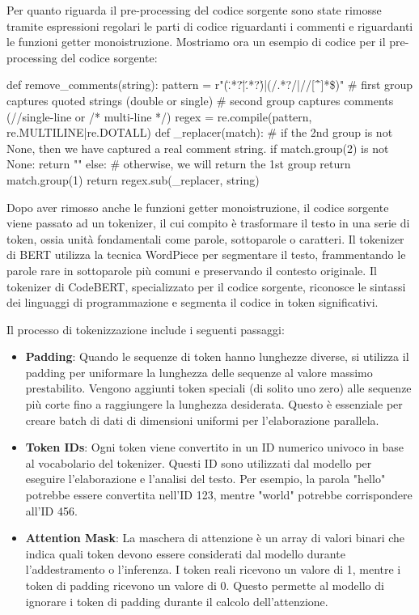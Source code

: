 \documentclass[../../Thesis.tex]{subfiles}
\begin{document}
Per quanto riguarda il pre-processing del codice sorgente sono state rimosse tramite espressioni regolari le parti di codice riguardanti i commenti e riguardanti le funzioni getter monoistruzione. Mostriamo ora un esempio di codice per il pre-processing del codice sorgente:
\begin{python}
    def remove_comments(string):
    pattern = r"(\".*?\"|\'.*?\')|(/\*.*?\*/|//[^\r\n]*\$)"
    # first group captures quoted strings (double or single)
    # second group captures comments (//single-line or /* multi-line */)
    regex = re.compile(pattern, re.MULTILINE|re.DOTALL)
    def _replacer(match):
        # if the 2nd group is not None, then we have captured a real comment string.
        if match.group(2) is not None:
            return ""
        else: # otherwise, we will return the 1st group
            return match.group(1)
    return regex.sub(_replacer, string)
\end{python}
Dopo aver rimosso anche le funzioni getter monoistruzione, il codice sorgente viene passato ad un tokenizer, il cui compito è trasformare il testo in una serie di token, ossia unità fondamentali come parole, sottoparole o caratteri. Il tokenizer di BERT utilizza la tecnica WordPiece per segmentare il testo, frammentando le parole rare in sottoparole più comuni e preservando il contesto originale. Il tokenizer di CodeBERT, specializzato per il codice sorgente, riconosce le sintassi dei linguaggi di programmazione e segmenta il codice in token significativi.

Il processo di tokenizzazione include i seguenti passaggi:

\begin{itemize}
    \item \textbf{Padding}: Quando le sequenze di token hanno lunghezze diverse, si utilizza il padding per uniformare la lunghezza delle sequenze al valore massimo prestabilito. Vengono aggiunti token speciali (di solito uno zero) alle sequenze più corte fino a raggiungere la lunghezza desiderata. Questo è essenziale per creare batch di dati di dimensioni uniformi per l'elaborazione parallela.
    
    \item \textbf{Token IDs}: Ogni token viene convertito in un ID numerico univoco in base al vocabolario del tokenizer. Questi ID sono utilizzati dal modello per eseguire l'elaborazione e l'analisi del testo. Per esempio, la parola "hello" potrebbe essere convertita nell'ID 123, mentre "world" potrebbe corrispondere all'ID 456.
    
    \item \textbf{Attention Mask}: La maschera di attenzione è un array di valori binari che indica quali token devono essere considerati dal modello durante l'addestramento o l'inferenza. I token reali ricevono un valore di 1, mentre i token di padding ricevono un valore di 0. Questo permette al modello di ignorare i token di padding durante il calcolo dell'attenzione.
\end{itemize}
\end{document}
